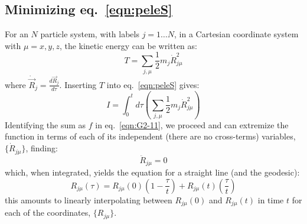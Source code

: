 \documentclass[letter,11pt]{article}
\newcommand{\svec}[1]{\vec{#1}}
\newcommand{\laeq}[1]{\label{eqn:#1}}
\newcommand{\refeq}[1]{eq.~\ref{eqn:#1}}
\begin{document}
\subsection{Minimizing \refeq{peleS}}
For an $N$ particle system, with labels $j=1 \ldots N$, in a Cartesian coordinate system with $\mu = x,y,z$, the kinetic energy can be written as:
\begin{equation}
  T = \sum_{j,\mu} \frac{1}{2} m_j \dot{R}_{j\mu}^2
\end{equation}
where $\dot{\svec{R}}_{j} = \frac{d\svec{R}_{j}}{d\tau}$. Inserting $T$ into \refeq{peleS} gives:
\begin{equation}
   I = \int_{0}^{t}d\tau\left( \sum_{j,\mu} \frac{1}{2} m_j \dot{R}_{j\mu}^2 \right)
\end{equation}
Identifying the sum as $f$ in \refeq{G2-11}, we proceed and can extremize the function in terms of each of its independent (there are no cross-terms) variables, $\{\dot{R}_{j\mu}\}$,  finding:
\begin{equation}
  \ddot{R}_{j\mu} = 0
\end{equation}
which, when integrated, yields the equation for a straight line (and the geodesic):
\begin{equation}\laeq{straightLine}
  R_{j\mu}(\tau) = R_{j\mu}(0) \left( 1-\frac{\tau}{t} \right) + R_{j\mu}(t)\left( \frac{\tau}{t} \right)
\end{equation}
this amounts to linearly interpolating between $R_{j\mu}(0)$ and $R_{j\mu}(t)$ in time $t$ for each of the coordinates, $\{R_{j\mu}\}$.
\end{document}
